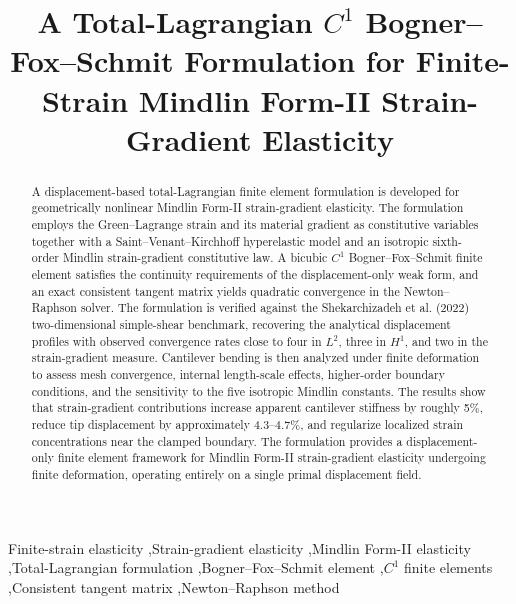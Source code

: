 \documentclass[preprint,12pt]{elsarticle}
\begin{document}
\begin{frontmatter}


\title{A Total-Lagrangian \texorpdfstring{$C^1$}{C1} Bogner--Fox--Schmit Formulation for Finite-Strain Mindlin Form-II Strain-Gradient Elasticity}


\author{}
\address{}


\begin{abstract}

A displacement-based total-Lagrangian finite element formulation is developed for geometrically nonlinear Mindlin Form-II strain-gradient elasticity. The formulation employs the Green--Lagrange strain and its material gradient as constitutive variables together with a Saint--Venant--Kirchhoff hyperelastic model and an isotropic sixth-order Mindlin strain-gradient constitutive law. A bicubic $C^1$ Bogner--Fox--Schmit finite element satisfies the continuity requirements of the displacement-only weak form, and an exact consistent tangent matrix yields quadratic convergence in the Newton--Raphson solver. The formulation is verified against the Shekarchizadeh et al. (2022) two-dimensional simple-shear benchmark, recovering the analytical displacement profiles with observed convergence rates close to four in $L^2$, three in $H^1$, and two in the strain-gradient measure. Cantilever bending is then analyzed under finite deformation to assess mesh convergence, internal length-scale effects, higher-order boundary conditions, and the sensitivity to the five isotropic Mindlin constants. The results show that strain-gradient contributions increase apparent cantilever stiffness by roughly 5\%, reduce tip displacement by approximately 4.3--4.7\%, and regularize localized strain concentrations near the clamped boundary. The formulation provides a displacement-only finite element framework for Mindlin Form-II strain-gradient elasticity undergoing finite deformation, operating entirely on a single primal displacement field.

\end{abstract}


\begin{keyword}
Finite-strain elasticity \sep Strain-gradient elasticity \sep Mindlin Form-II elasticity \sep Total-Lagrangian formulation \sep Bogner--Fox--Schmit element \sep $C^1$ finite elements \sep Consistent tangent matrix \sep Newton--Raphson method
\end{keyword}

\end{frontmatter}
\end{document}
